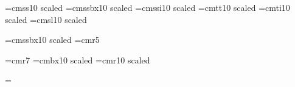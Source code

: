 
\font\tenrm=cmss10 scaled
\font\tenbf=cmssbx10 scaled
\font\teni=cmssi10 scaled
\font\tentt=cmtt10 scaled
\font\tenit=cmti10 scaled
\font\tensl=cmsl10 scaled

\def\fB{\bf}
\def\fD{\rm}
\font\fS=cmssbx10 scaled
\font\fC=cmr5

\font\sevenrm=cmr7                      %
\font\twelvebf=cmbx10 scaled   %
\font\forteenrm=cmr10 scaled   %

\voffset=68pt
\hoffset=0in
\vsize=5.75in
\hsize=9in
\parindent=3pc
\raggedright
{}	%


\def\makeheadline{
    \vbox to 0pt{
	\vskip-102pt
	\line{\vbox to 20pt{}\hrulefill}
        \line{\vbox to 40pt{}\fS \hss\TitleLine\hss}
	\line{\vbox to 20pt{}\hrulefill}
	\vss
    }
    \nointerlineskip
}
	
\footline={\ICSfooter}

\def\MyChap{?}
\gdef\FileName{}

\def\ICSfooter{\hrulefill
    {\fC $\copyright$ Copyright
	Integrated Computer Systems.
	Not to be reproduced without prior written consent.
	All rights reserved.}
    \hrulefill\ \MyChap-\folio}

\def\VISfooter{
    \FileName\hrulefill
    {\fC
        Copyright $\copyright$ 1987
	by Virtual Infinity Systems.
	All rights reserved.
    }
    \hrulefill\ \MyChap-\folio
}


\def\SectionNote#1#2{\vskip 10pt\B (#1) #2\par}

\def\Chapter#1#2{\def\MyChap{#1}\NewTitle{Chapter #1.  #2}\ \par}
\def\Section#1#2{\EndFrame\NewTitle{#2}}
\def\NewTitle#1{\def\TitleLine{#1}\def\ContTitle{#1 (con't)}}
\def\EndFrame{\par\vfil\eject\footline={\ICSfooter}\vfil}


